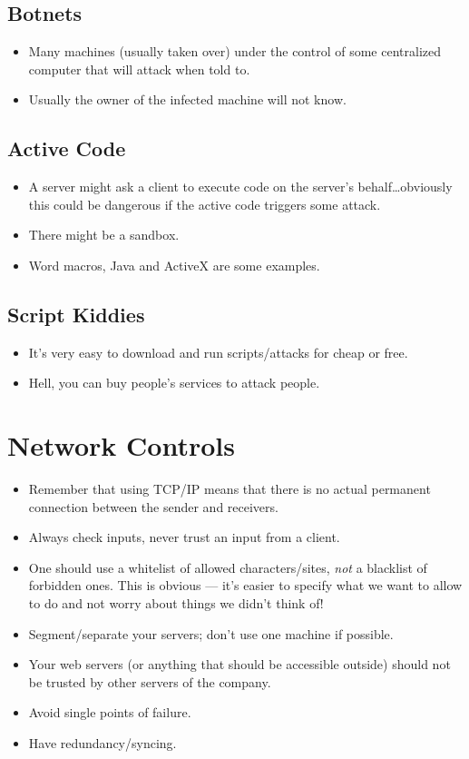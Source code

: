 \documentclass{article}
\begin{document}
\subsection{Botnets}
\begin{itemize}
    \item Many machines (usually taken over) under the control of some centralized computer that will attack when told to.
    \item Usually the owner of the infected machine will not know.
\end{itemize}

\subsection{Active Code}
\begin{itemize}
    \item A server might ask a client to execute code on the server's behalf\dots obviously this could be dangerous if the active code triggers some attack.
    \item There might be a sandbox.
    \item Word macros, Java and ActiveX are some examples.
\end{itemize}

\subsection{Script Kiddies}
\begin{itemize}
    \item It's very easy to download and run scripts/attacks for cheap or free.
    \item Hell, you can buy people's services to attack people.
\end{itemize}

\section{Network Controls}
\begin{itemize}
    \item Remember that using TCP/IP means that there is no actual permanent connection between the sender and receivers.
    \item Always check inputs, never trust an input from a client.
    \item One should use a whitelist of allowed characters/sites, \emph{not} a blacklist of forbidden ones.  This is obvious --- it's easier to specify what we want to allow to do and not worry about things we didn't think of!
    \item Segment/separate your servers; don't use one machine if possible.
    \item Your web servers (or anything that should be accessible outside) should not be trusted by other servers of the company.
    \item Avoid single points of failure.
    \item Have redundancy/syncing.
\end{itemize}
\end{document}
